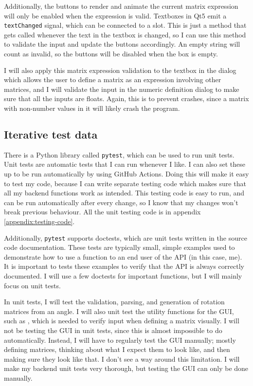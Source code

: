 \documentclass[../main.tex]{subfiles}
\begin{document}
Additionally, the buttons to render and animate the current matrix expression will only be enabled when the expression is valid. Textboxes in Qt5 emit a \texttt{textChanged} signal, which can be connected to a slot. This is just a method that gets called whenever the text in the textbox is changed, so I can use this method to validate the input and update the buttons accordingly. An empty string will count as invalid, so the buttons will be disabled when the box is empty.

I will also apply this matrix expression validation to the textbox in the dialog which allows the user to define a matrix as an expression involving other matrices, and I will validate the input in the numeric definition dialog to make sure that all the inputs are floats. Again, this is to prevent crashes, since a matrix with non-number values in it will likely crash the program.

\subsection{Iterative test data\label{design:iterative-test-data}}

There is a Python library called \texttt{pytest}, which can be used to run unit tests\cite{pytest-docs}. Unit tests are automatic tests that I can run whenever I like\cite{wikipedia-unit-testing}. I can also set these up to be run automatically by using GitHub Actions\cite{github-actions-docs}. Doing this will make it easy to test my code, because I can write separate testing code which makes sure that all my backend functions work as intended. This testing code is easy to run, and can be run automatically after every change, so I know that my changes won't break previous behaviour. All the unit testing code is in appendix \ref{appendix:testing-code}.

Additionally, \texttt{pytest} supports doctests\cite{pytest-docs-doctest}, which are unit tests written in the source code documentation\cite{python-3-doctest-module}. These tests are typically small, simple examples used to demonstrate how to use a function to an end user of the API (in this case, me). It is important to tests these examples to verify that the API is always correctly documented. I will use a few doctests for important functions, but I will mainly focus on unit tests.

In unit tests, I will test the validation, parsing, and generation of rotation matrices from an angle. I will also unit test the utility functions for the GUI, such as , which is needed to verify input when defining a matrix visually. I will not be testing the GUI in unit tests, since this is almost impossible to do automatically. Instead, I will have to regularly test the GUI manually; mostly defining matrices, thinking about what I expect them to look like, and then making sure they look like that. I don't see a way around this limitation. I will make my backend unit tests very thorough, but testing the GUI can only be done manually.
\end{document}

